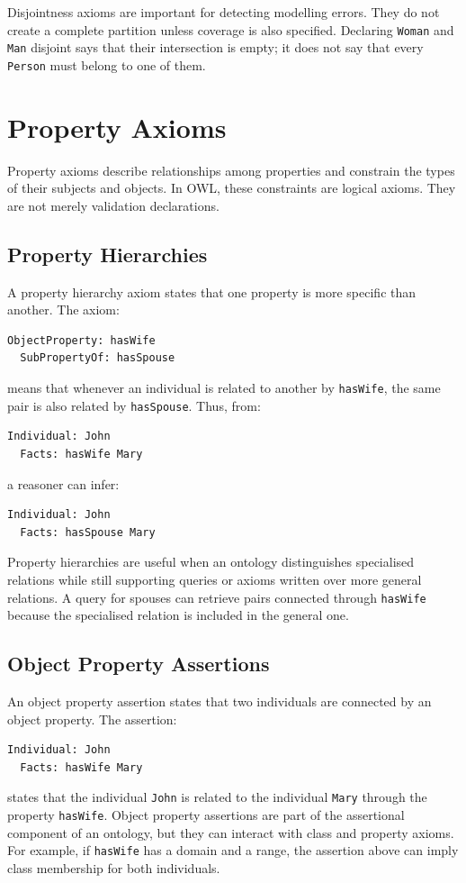 \documentclass{scrbook}
\begin{document}
	Disjointness axioms are important for detecting modelling errors. They do not create a complete partition unless coverage is also specified. Declaring \texttt{Woman} and \texttt{Man} disjoint says that their intersection is empty; it does not say that every \texttt{Person} must belong to one of them.
	
	\section{Property Axioms}
	
	Property axioms describe relationships among properties and constrain the types of their subjects and objects. In OWL, these constraints are logical axioms. They are not merely validation declarations.
	
	\subsection{Property Hierarchies}
	
	A property hierarchy axiom states that one property is more specific than another. The axiom:
	\begin{lstlisting}
ObjectProperty: hasWife
  SubPropertyOf: hasSpouse
	\end{lstlisting}
	means that whenever an individual is related to another by \texttt{hasWife}, the same pair is also related by \texttt{hasSpouse}. Thus, from:
	\begin{lstlisting}
Individual: John
  Facts: hasWife Mary
	\end{lstlisting}
	a reasoner can infer:
	\begin{lstlisting}
Individual: John
  Facts: hasSpouse Mary
	\end{lstlisting}
	
	Property hierarchies are useful when an ontology distinguishes specialised relations while still supporting queries or axioms written over more general relations. A query for spouses can retrieve pairs connected through \texttt{hasWife} because the specialised relation is included in the general one.
	
	\subsection{Object Property Assertions}
	
	An object property assertion states that two individuals are connected by an object property. The assertion:
	\begin{lstlisting}
Individual: John
  Facts: hasWife Mary
	\end{lstlisting}
	states that the individual \texttt{John} is related to the individual \texttt{Mary} through the property \texttt{hasWife}. Object property assertions are part of the assertional component of an ontology, but they can interact with class and property axioms. For example, if \texttt{hasWife} has a domain and a range, the assertion above can imply class membership for both individuals.
	
\end{document}
